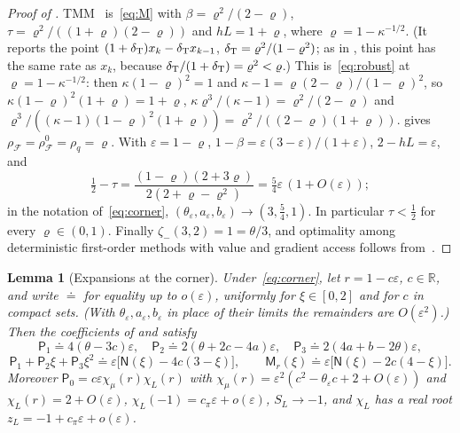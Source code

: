 \documentclass[11pt]{article}
\newtheorem{lemma}[theorem]{Lemma}
\theoremstyle{definition}
\theoremstyle{remark}
\newcommand{\R}{\mathbb R}
\newcommand{\cF}{\mathcal F}
\newcommand{\sfP}{\mathsf P}
\newcommand{\rhoF}{\rho_{\cF}}
\newcommand{\rhoz}{\rho_{\cF}^{0}}
\newcommand{\cpi}{c_{\pi}}
\begin{document}
\begin{proof}[Proof of ]
TMM~\cite{VFL18} is~\eqref{eq:M} with \(\beta=\varrho^2/(2-\varrho)\), \(\tau=\varrho^2/((1+\varrho)(2-\varrho))\) and
\(hL=1+\varrho\), where \(\varrho=1-\kappa^{-1/2}\).  (It reports the point \((1+\delta_{\rm T})x_k-\delta_{\rm T}x_{k-1}\),
\(\delta_{\rm T}=\varrho^2/(1-\varrho^2)\); as in , this point has the same rate as \(x_k\), because
\(\delta_{\rm T}/(1+\delta_{\rm T})=\varrho^2<\varrho\).)  This is~\eqref{eq:robust} at \(\varrho=1-\kappa^{-1/2}\): then
\(\kappa(1-\varrho)^2=1\) and \(\kappa-1=\varrho(2-\varrho)/(1-\varrho)^2\), so \(\kappa(1-\varrho)^2(1+\varrho)=1+\varrho\),
\(\kappa\varrho^3/(\kappa-1)=\varrho^2/(2-\varrho)\) and \(\varrho^3/((\kappa-1)(1-\varrho)^2(1+\varrho))=\varrho^2/((2-\varrho)(1+\varrho))\).
 gives \(\rhoF=\rhoz=\rho_q=\varrho\).  With \(\varepsilon=1-\varrho\),
\(1-\beta=\varepsilon(3-\varepsilon)/(1+\varepsilon)\), \(2-hL=\varepsilon\), and
\[
\tfrac12-\tau=\frac{(1-\varrho)(2+3\varrho)}{2(2+\varrho-\varrho^2)}=\tfrac54\varepsilon\,(1+O(\varepsilon));
\]
in the notation of~\eqref{eq:corner}, \((\theta_\varepsilon,a_\varepsilon,b_\varepsilon)\to(3,\frac54,1)\).  In particular
\(\tau<\frac12\) for every \(\varrho\in(0,1)\).  Finally \(\zeta_-(3,2)=1=\theta/3\), and optimality among deterministic first-order methods with value and gradient access
follows from~\cite{DT22}.
\end{proof}
\begin{lemma}[Expansions at the corner]\label{lem:cornerexp}
Under~\eqref{eq:corner}, let \(r=1-c\varepsilon\), \(c\in\R\), and write \(\doteq\) for equality up to
\(o(\varepsilon)\), uniformly for \(\xi\in[0,2]\) and for \(c\) in compact sets.  (With \(\theta_\varepsilon,a_\varepsilon,b_\varepsilon\) in
place of their limits the remainders are \(O(\varepsilon^2)\).)
Then the coefficients of  and  satisfy
\[
\sfP_1\doteq4(\theta-3c)\varepsilon,\quad \sfP_2\doteq2(\theta+2c-4a)\varepsilon,\quad \sfP_3\doteq2(4a+b-2\theta)\varepsilon,
\]
\[
\sfP_1+\sfP_2\xi+\sfP_3\xi^2\doteq\varepsilon\bigl[\mathsf N(\xi)-4c(3-\xi)\bigr],\qquad
\mathsf M_r(\xi)\doteq\varepsilon\bigl[\mathsf N(\xi)-2c(4-\xi)\bigr].
\]
Moreover \(\sfP_0=c\varepsilon\chi_\mu(r)\chi_L(r)\) with \(\chi_\mu(r)=\varepsilon^2(c^2-\theta_\varepsilon c+2+O(\varepsilon))\) and \(\chi_L(r)=2+O(\varepsilon)\),
\(\chi_L(-1)=\cpi\varepsilon+o(\varepsilon)\), \(S_L\to-1\), and \(\chi_L\) has a real root \(z_L=-1+\cpi\varepsilon+o(\varepsilon)\).
\end{lemma}
\end{document}
